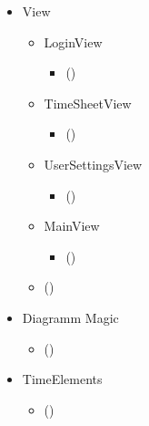         \begin{itemize}
            \item{View}
                \begin{itemize}
                    \item{LoginView}
                    \begin{itemize}
                        \item()
                    \end{itemize}

                    \item{TimeSheetView}
                    \begin{itemize}
                        \item()
                    \end{itemize}

                    \item{UserSettingsView}
                    \begin{itemize}
                        \item()
                    \end{itemize}

                    \item{MainView}
                    \begin{itemize}
                        \item()
                    \end{itemize}

                \end{itemize}
                \begin{itemize}
                    \item()
                \end{itemize}

            \item{Diagramm Magic}
            \begin{itemize}
                \item()
            \end{itemize}

            \item{TimeElements}
            \begin{itemize}
                \item()
            \end{itemize}

        \end{itemize}
